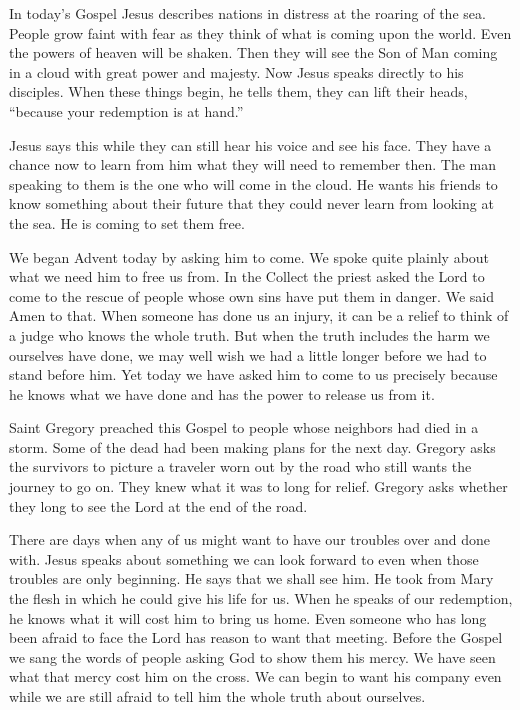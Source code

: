 In today’s Gospel Jesus describes nations in distress at the roaring of the sea. People grow faint with fear as they think of what is coming upon the world. Even the powers of heaven will be shaken. Then they will see the Son of Man coming in a cloud with great power and majesty. Now Jesus speaks directly to his disciples. When these things begin, he tells them, they can lift their heads, “because your redemption is at hand.”

Jesus says this while they can still hear his voice and see his face. They have a chance now to learn from him what they will need to remember then. The man speaking to them is the one who will come in the cloud. He wants his friends to know something about their future that they could never learn from looking at the sea. He is coming to set them free.

We began Advent today by asking him to come. We spoke quite plainly about what we need him to free us from. In the Collect the priest asked the Lord to come to the rescue of people whose own sins have put them in danger. We said Amen to that. When someone has done us an injury, it can be a relief to think of a judge who knows the whole truth. But when the truth includes the harm we ourselves have done, we may well wish we had a little longer before we had to stand before him. Yet today we have asked him to come to us precisely because he knows what we have done and has the power to release us from it.

Saint Gregory preached this Gospel to people whose neighbors had died in a storm. Some of the dead had been making plans for the next day. Gregory asks the survivors to picture a traveler worn out by the road who still wants the journey to go on. They knew what it was to long for relief. Gregory asks whether they long to see the Lord at the end of the road.

There are days when any of us might want to have our troubles over and done with. Jesus speaks about something we can look forward to even when those troubles are only beginning. He says that we shall see him. He took from Mary the flesh in which he could give his life for us. When he speaks of our redemption, he knows what it will cost him to bring us home. Even someone who has long been afraid to face the Lord has reason to want that meeting. Before the Gospel we sang the words of people asking God to show them his mercy. We have seen what that mercy cost him on the cross. We can begin to want his company even while we are still afraid to tell him the whole truth about ourselves.

